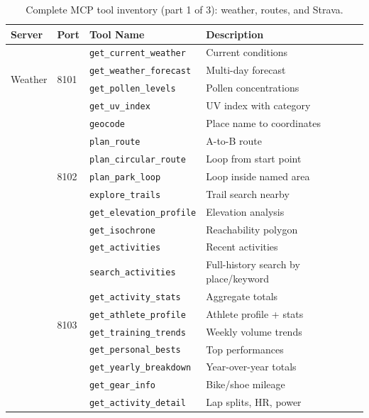 \begin{table}[ht]
\begin{center}
\begin{minipage}{\textwidth}
\caption[Complete MCP tool inventory (1/3)]{Complete MCP tool inventory (part 1 of 3): weather, routes, and Strava.}\label{tab:full_tools}
\begin{tabularx}{\textwidth}{lllX}
\toprule
\textbf{Server} & \textbf{Port} & \textbf{Tool Name} & \textbf{Description} \\
\midrule
\multirow{4}{*}{Weather} & \multirow{4}{*}{8101}
  & \texttt{get\_current\_weather} & Current conditions \\
  & & \texttt{get\_weather\_forecast} & Multi-day forecast \\
  & & \texttt{get\_pollen\_levels} & Pollen concentrations \\
  & & \texttt{get\_uv\_index} & UV index with category \\
\addlinespace
\multirow{7}{*}{Routes} & \multirow{7}{*}{8102}
  & \texttt{geocode} & Place name to coordinates \\
  & & \texttt{plan\_route} & A-to-B route \\
  & & \texttt{plan\_circular\_route} & Loop from start point \\
  & & \texttt{plan\_park\_loop} & Loop inside named area \\
  & & \texttt{explore\_trails} & Trail search nearby \\
  & & \texttt{get\_elevation\_profile} & Elevation analysis \\
  & & \texttt{get\_isochrone} & Reachability polygon \\
\addlinespace
\multirow{14}{*}{Strava} & \multirow{14}{*}{8103}
  & \texttt{get\_activities} & Recent activities \\
  & & \texttt{search\_activities} & Full-history search by place/keyword \\
  & & \texttt{get\_activity\_stats} & Aggregate totals \\
  & & \texttt{get\_athlete\_profile} & Athlete profile + stats \\
  & & \texttt{get\_training\_trends} & Weekly volume trends \\
  & & \texttt{get\_personal\_bests} & Top performances \\
  & & \texttt{get\_yearly\_breakdown} & Year-over-year totals \\
  & & \texttt{get\_gear\_info} & Bike/shoe mileage \\
  & & \texttt{get\_activity\_detail} & Lap splits, HR, power \\

\end{tabularx}
\end{minipage}
\end{center}
\end{table}
